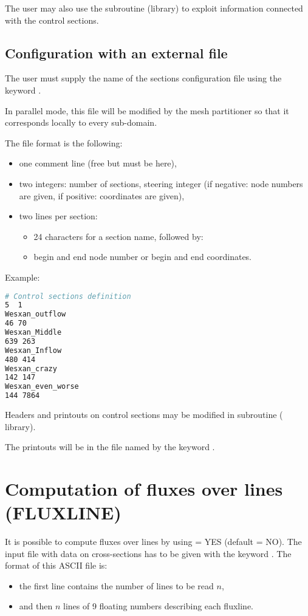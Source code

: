 The user may also use the subroutine  (\bief library)
to exploit information connected with the control sections.


\subsection{Configuration with an external file}

The user must supply the name of the sections configuration file
using the keyword .

In parallel mode, this file will be modified by the mesh partitioner
so that it corresponds locally to every sub-domain.

The file format is the following:

\begin{itemize}
\item one comment line (free but must be here),

\item two integers: number of sections, steering integer
(if negative: node numbers are given, if positive: coordinates are given),

\item two lines per section:

\begin{itemize}

\item 24 characters for a section name, followed by:

\item begin and end node number or begin and end coordinates.

\end{itemize}
\end{itemize}

Example:
\begin{lstlisting}[language=bash]
# Control sections definition
5  1
Wesxan_outflow
46 70
Wesxan_Middle
639 263
Wesxan_Inflow
480 414
Wesxan_crazy
142 147
Wesxan_even_worse
144 7864
\end{lstlisting}

Headers and printouts on control sections may be modified in
 subroutine ( library).

The printouts will be in the file named by the keyword
.


\section{Computation of fluxes over lines (FLUXLINE)}

It is possible to compute fluxes over lines by using
 = YES (default = NO).
The input file with data on cross-sections has to be given
with the keyword .
The format of this ASCII file is:
\begin{itemize}
\item the first line contains the number of lines to be read $n$,
\item and then $n$ lines of 9 floating numbers describing each fluxline.
\end{itemize}
